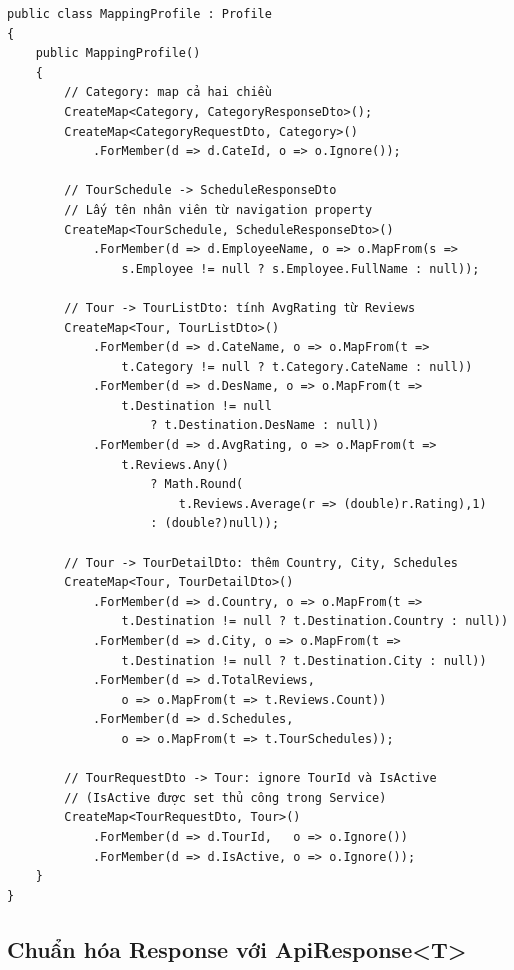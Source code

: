 \begin{lstlisting}[style=csharp,
  caption={MappingProfile -- AutoMapper thực tế của hệ thống},
  label={lst:mapper}]
public class MappingProfile : Profile
{
    public MappingProfile()
    {
        // Category: map cả hai chiều
        CreateMap<Category, CategoryResponseDto>();
        CreateMap<CategoryRequestDto, Category>()
            .ForMember(d => d.CateId, o => o.Ignore());

        // TourSchedule -> ScheduleResponseDto
        // Lấy tên nhân viên từ navigation property
        CreateMap<TourSchedule, ScheduleResponseDto>()
            .ForMember(d => d.EmployeeName, o => o.MapFrom(s =>
                s.Employee != null ? s.Employee.FullName : null));

        // Tour -> TourListDto: tính AvgRating từ Reviews
        CreateMap<Tour, TourListDto>()
            .ForMember(d => d.CateName, o => o.MapFrom(t =>
                t.Category != null ? t.Category.CateName : null))
            .ForMember(d => d.DesName, o => o.MapFrom(t =>
                t.Destination != null
                    ? t.Destination.DesName : null))
            .ForMember(d => d.AvgRating, o => o.MapFrom(t =>
                t.Reviews.Any()
                    ? Math.Round(
                        t.Reviews.Average(r => (double)r.Rating),1)
                    : (double?)null));

        // Tour -> TourDetailDto: thêm Country, City, Schedules
        CreateMap<Tour, TourDetailDto>()
            .ForMember(d => d.Country, o => o.MapFrom(t =>
                t.Destination != null ? t.Destination.Country : null))
            .ForMember(d => d.City, o => o.MapFrom(t =>
                t.Destination != null ? t.Destination.City : null))
            .ForMember(d => d.TotalReviews,
                o => o.MapFrom(t => t.Reviews.Count))
            .ForMember(d => d.Schedules,
                o => o.MapFrom(t => t.TourSchedules));

        // TourRequestDto -> Tour: ignore TourId và IsActive
        // (IsActive được set thủ công trong Service)
        CreateMap<TourRequestDto, Tour>()
            .ForMember(d => d.TourId,   o => o.Ignore())
            .ForMember(d => d.IsActive, o => o.Ignore());
    }
}
\end{lstlisting}

\subsection{Chuẩn hóa Response với ApiResponse<T>}\label{sub3.5.3}

